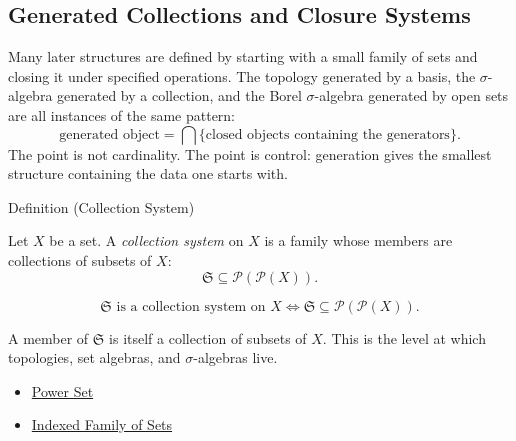 
\subsection{Generated Collections and Closure Systems}

\begin{exposition}
Many later structures are defined by starting with a small family of sets and
closing it under specified operations.  The topology generated by a basis, the
$\sigma$-algebra generated by a collection, and the Borel $\sigma$-algebra
generated by open sets are all instances of the same pattern:
\[
\text{generated object}
=
\bigcap\{\text{closed objects containing the generators}\}.
\]
The point is not cardinality.  The point is control: generation gives the
smallest structure containing the data one starts with.
\end{exposition}

\begin{definitionbox}{Definition (Collection System)}
\begin{definition}\label{def:collection-system}
Let $X$ be a set. A \emph{collection system} on $X$ is a family whose members
are collections of subsets of $X$:
\[
\mathfrak{S}\subseteq \mathcal{P}(\mathcal{P}(X)).
\]
\end{definition}
\end{definitionbox}

\begin{remark*}
\[
\mathfrak S\text{ is a collection system on }X
\iff
\mathfrak S\subseteq\mathcal P(\mathcal P(X)).
\]
\end{remark*}

\begin{remark*}[Interpretation]
A member of $\mathfrak{S}$ is itself a collection of subsets of $X$.  This is
the level at which topologies, set algebras, and $\sigma$-algebras live.
\end{remark*}


\begin{dependencies}
\begin{itemize}
  \item \hyperref[def:power-set]{Power Set}
  \item \hyperref[def:indexed-family]{Indexed Family of Sets}
\end{itemize}
\end{dependencies}

